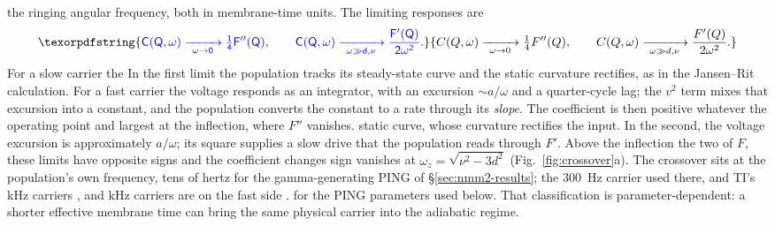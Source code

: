 \documentclass[11pt,a4paper]{article}
\providecommand{\DIFaddtex}[1]{{\protect\color{blue} \sf #1}} %
\providecommand{\DIFdeltex}[1]{{\protect\color{red} \scriptsize #1}} %
\providecommand{\DIFaddbegin}{} %
\providecommand{\DIFaddend}{} %
\providecommand{\DIFdelbegin}{} %
\providecommand{\DIFdelend}{} %
\providecommand{\DIFadd}[1]{\texorpdfstring{\DIFaddtex{#1}}{#1}} %
\providecommand{\DIFdel}[1]{\texorpdfstring{\DIFdeltex{#1}}{}} %
\begin{document}
\DIFdelend \DIFaddbegin \DIFadd{the ringing angular frequency, both in membrane-time units. The limiting responses are
}\begin{equation}
\DIFadd{C(Q,\omega)\xrightarrow[\ \omega\to0\ ]{}\tfrac14F''(Q),\qquad
C(Q,\omega)\xrightarrow[\ \omega\gg d,\nu\ ]{}\frac{F'(Q)}{2\omega^2}.
\label{eq:crossover_limits}
}\end{equation}\DIFaddend
\DIFdelbegin \DIFdel{For a slow carrier the }\DIFdelend \DIFaddbegin \DIFadd{In the first limit the }\DIFaddend population tracks its \DIFdelbegin \DIFdel{steady-state curve and the static curvature
rectifies, as in the Jansen--Rit calculation. For a fast carrier the voltage responds as an
integrator, with an excursion $\sim a/\omega$ and a quarter-cycle lag; the $v^2$ term mixes
that excursion into a constant, and the population converts the constant to a rate through its \emph{slope}. The coefficient is then positive whatever the operating point and largest
at the inflection, where $F''$ vanishes. }\DIFdelend \DIFaddbegin \DIFadd{static curve, whose curvature rectifies
the input. In the second, the voltage excursion is approximately $a/\omega$; its
square supplies a slow drive that the population reads through $F'$. }\DIFaddend Above the
inflection \DIFdelbegin \DIFdel{the two }\DIFdelend \DIFaddbegin \DIFadd{of $F$, these }\DIFaddend limits have opposite signs and the coefficient \DIFdelbegin \DIFdel{changes sign }\DIFdelend \DIFaddbegin \DIFadd{vanishes }\DIFaddend at
$\omega_z=\sqrt{\nu^2-3d^2}$ (Fig.~\ref{fig:crossover}a). The \DIFdelbegin \DIFdel{crossover sits at the population's own frequency, tens of
hertz for the gamma-generating PING of \S\ref{sec:nmm2-results}; the }\DIFdelend $300$~Hz \DIFdelbegin \DIFdel{carrier used
there, and TI's kHz carriers
, }\DIFdelend \DIFaddbegin \DIFadd{and kHz carriers
}\DIFaddend are on the fast side \DIFdelbegin \DIFdel{.
}\DIFdelend \DIFaddbegin \DIFadd{for the PING parameters used below. That classification is
parameter-dependent: a shorter effective membrane time can bring the same physical
carrier into the adiabatic regime.
}\DIFaddend
\end{document}
